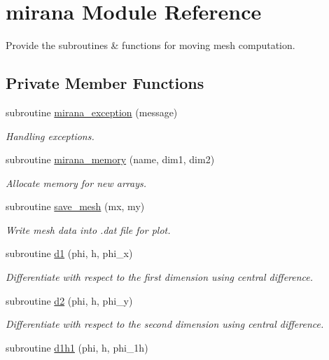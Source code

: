 \hypertarget{classmirana}{\section{mirana Module Reference}
\label{classmirana}
}


Provide the subroutines \& functions for moving mesh computation.  


\subsection*{Private Member Functions}
\begin{DoxyCompactItemize}
\item 
subroutine \hyperlink{classmirana_ab002a22665f70b4c65bdcf70ac96d768}{mirana\-\_\-exception} (message)
\begin{DoxyCompactList}\small\item\em Handling exceptions. \end{DoxyCompactList}\item 
subroutine \hyperlink{classmirana_acccf612b21e3e65bd3a78131c48afe2b}{mirana\-\_\-memory} (name, dim1, dim2)
\begin{DoxyCompactList}\small\item\em Allocate memory for new arrays. \end{DoxyCompactList}\item 
subroutine \hyperlink{classmirana_a9cbee1a318e5e828590c9ccaa51c8472}{save\-\_\-mesh} (mx, my)
\begin{DoxyCompactList}\small\item\em Write mesh data into .dat file for plot. \end{DoxyCompactList}\item 
subroutine \hyperlink{classmirana_a4009036e8b04ac992641e36d34ab0ed4}{d1} (phi, h, phi\-\_\-x)
\begin{DoxyCompactList}\small\item\em Differentiate with respect to the first dimension using central difference. \end{DoxyCompactList}\item 
subroutine \hyperlink{classmirana_a21348ffe170eafc6fc2a009256b1b6e3}{d2} (phi, h, phi\-\_\-y)
\begin{DoxyCompactList}\small\item\em Differentiate with respect to the second dimension using central difference. \end{DoxyCompactList}\item 
subroutine \hyperlink{classmirana_acc84c99770972f6328e89ac04ac67153}{d1h1} (phi, h, phi\-\_\-1h)

\end{DoxyCompactItemize}
